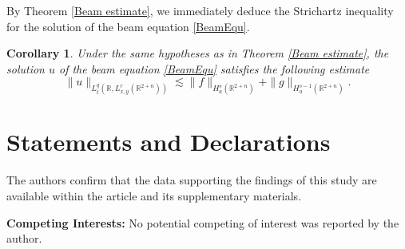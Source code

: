 \documentclass[a4paper,11pt, reqno]{amsart}
\numberwithin{equation}{section}
\theoremstyle{plain}
\newtheorem{corollary}[theorem]{Corollary}
\theoremstyle{definition}
\theoremstyle{remark}
\begin{document}
By Theorem \ref{Beam estimate}, we immediately deduce the Strichartz inequality for the solution of the beam equation \eqref{BeamEqu}. 
\begin{corollary}
Under the same hypotheses as in Theorem \ref{Beam estimate}, the solution $u$ of the beam equation \eqref{BeamEqu} satisfies the following estimate
	\begin{equation*}
	\|u\|_{L_t^q(\mathbb{R},L^r_{x,y}(\mathbb{R}^{2+n}))}\lesssim \|f\|_{H^s_a(\mathbb{R}^{2+n})}+\|g\|_{H^{s-1}_a(\mathbb{R}^{2+n})}.
	\end{equation*}
\end{corollary}

\section*{Statements and Declarations} The authors confirm that the data supporting the findings of this study are available within the article and its supplementary materials.

  \textbf{Competing Interests:} No potential competing of interest was reported by the author. 
	
	
	
\end{document}
